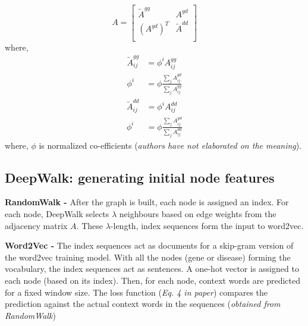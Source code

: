 \begin{sloppypar*}
        \begin{equation}
            A = 
                \begin{bmatrix}
                    \tilde{A}^{gg} & A^{gd} \\
                    (A^{gd})^T & \tilde{A}^{dd} \\
                \end{bmatrix}
        \end{equation} 
        \noindent where,
        \begin{equation}
            \begin{aligned}
                \tilde{A}^{gg}_{ij} &= \phi^i A^{gg}_{ij} \\
                \phi^i &= \phi \frac{\sum_j A^{gd}_{ij}}{\sum_j A^{gg}_{ij}}
            \end{aligned}
        \end{equation}
        \begin{equation}
            \begin{aligned}
                \tilde{A}^{dd}_{ij} &= \phi^i A^{dd}_{ij} \\
                \phi^i &= \phi \frac{\sum_j A^{gd}_{ij}}{\sum_j A^{dd}_{ij}}
            \end{aligned}
        \end{equation}
        \noindent where, $\phi$ is normalized co-efficients (\textit{authors have
        not elaborated on the meaning}).

    \subsection{DeepWalk: generating initial node features}
        \textbf{RandomWalk -} After the graph is built, each node is assigned
        an index. For each node, DeepWalk selects $\lambda$ neighbours based on
        edge weights from the adjacency matrix $A$. These $\lambda$-length, index
        sequences form the input to word2vec.\hfill\break

        \textbf{Word2Vec -} The index sequences act as documents for a
        skip-gram version of the word2vec training model. With all the nodes (gene or
        disease) forming the vocabulary, the index sequences act as sentences. A
        one-hot vector is assigned to each node (based on its index). Then, for each
        node, context words are predicted for a fixed window size. The loss function
        (\textit{Eq. 4 in paper}) compares the prediction against the actual context
        words in the sequences (\textit{obtained from RandomWalk})\hfill\break


\end{sloppypar*}
